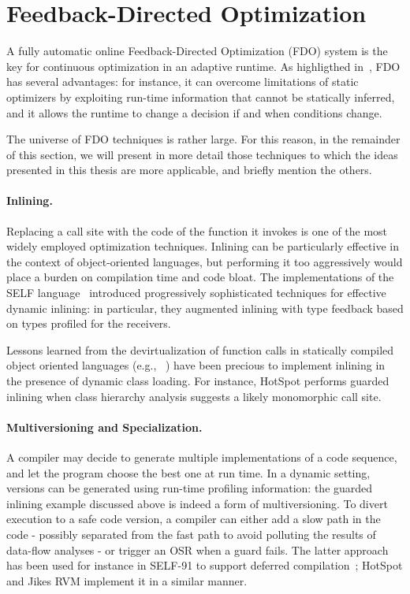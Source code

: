 \section{Feedback-Directed Optimization}
A fully automatic online Feedback-Directed Optimization (FDO) system is the key for continuous optimization in an adaptive runtime. As highligthed in~\cite{Arnold05}, FDO has several advantages: for instance, it can overcome limitations of static optimizers by exploiting run-time information that cannot be statically inferred, and it allows the runtime to change a decision if and when conditions change.

The universe of FDO techniques is rather large. For this reason, in the remainder of this section, we will present in more detail those techniques to which the ideas presented in this thesis are more applicable, and briefly mention the others.

\paragraph*{Inlining.} Replacing a call site with the code of the function it invokes is one of the most widely employed optimization techniques. Inlining can be particularly effective in the context of object-oriented languages, but performing it too aggressively would place a burden on compilation time and code bloat. The implementations of the SELF language~\cite{Holzle92,Holzle96} introduced progressively sophisticated techniques for effective dynamic inlining: in particular, they augmented inlining with type feedback based on types profiled for the receivers.

Lessons learned from the devirtualization of function calls in statically compiled object oriented languages (e.g., ~\cite{Bacon96,Dean96}) have been precious to implement inlining in the presence of dynamic class loading. For instance, HotSpot performs guarded inlining when class hierarchy analysis suggests a likely monomorphic call site.

\paragraph*{Multiversioning and Specialization.} A compiler may decide to generate multiple implementations of a code sequence, and let the program choose the best one at run time. In a dynamic setting, versions can be generated using run-time profiling information: the guarded inlining example discussed above is indeed a form of multiversioning. To divert execution to a safe code version, a compiler can either add a slow path in the code - possibly separated from the fast path to avoid polluting the results of data-flow analyses - or trigger an OSR when a guard fails. The latter approach has been used for instance in SELF-91 to support deferred compilation~\cite{Chambers91}; HotSpot and Jikes RVM implement it in a similar manner.

